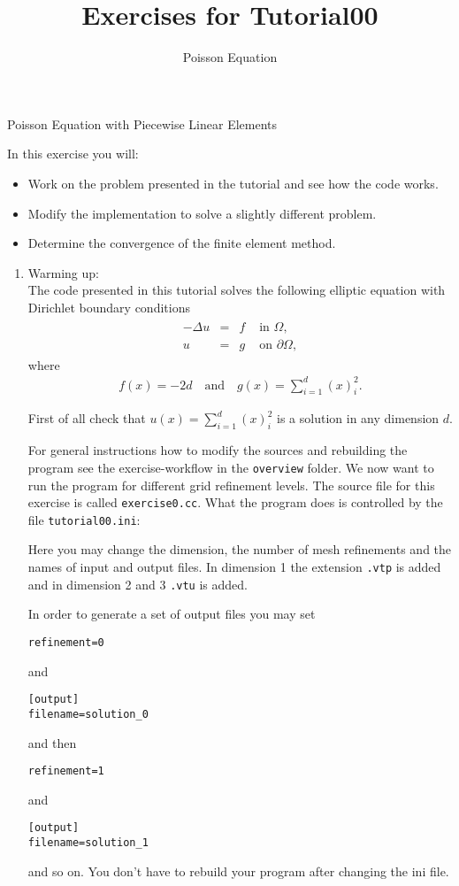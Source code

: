 \documentclass[12pt,a4paper]{article}
\title{\textbf{Exercises for Tutorial00}}
\subtitle{Poisson Equation}
\newcommand{\Laplace}{\Delta}
\begin{document}
\exerciseheader

\begin{Exercise}{Poisson Equation with Piecewise Linear Elements}

In this exercise you will:
\begin{itemize}
\item Work on the problem presented in the tutorial and see how the
  code works.
\item Modify the implementation to solve a slightly different problem.
\item Determine the convergence of the finite element method.
\end{itemize}

\begin{enumerate}
\item {\sc Warming up}:\\
  The code presented in this tutorial solves the following elliptic
  equation with Dirichlet boundary conditions
  \begin{align*}
    \begin{array}{rcll}
      -\Laplace u  & = & f & \text{ in } \Omega, \\
      u & = & g & \text{ on } \partial\Omega,
    \end{array}
  \end{align*}
  where
  \begin{align*}
    f(x) = -2d \quad\text{and}\quad  g(x) = \sum_{i=1}^d (x)_i^2.
  \end{align*}

  First of all check that $u(x) = \sum_{i=1}^d (x)_i^2$ is a solution
  in any dimension $d$.

  For general instructions how to modify the sources and rebuilding
  the program see the exercise-workflow in the \lstinline{overview}
  folder.  We now want to run the program for different grid
  refinement levels.  The source file for this exercise is called
  \lstinline{exercise0.cc}.  What the program does is controlled by
  the file \lstinline{tutorial00.ini}:
  

  Here you may change the dimension, the number of mesh refinements
  and the names of input and output files. In dimension 1 the
  extension \lstinline{.vtp} is added and in dimension 2 and 3
  \lstinline{.vtu} is added.

  In order to generate a set of output files you may set
  \begin{lstlisting}
refinement=0
  \end{lstlisting}
  and
  \begin{lstlisting}
[output]
filename=solution_0
  \end{lstlisting}
  and then
  \begin{lstlisting}
refinement=1
  \end{lstlisting}
  and
  \begin{lstlisting}
[output]
filename=solution_1
  \end{lstlisting}
  and so on.  You don't have to rebuild your program after changing
  the ini file.


\end{enumerate}
\end{Exercise}
\end{document}
